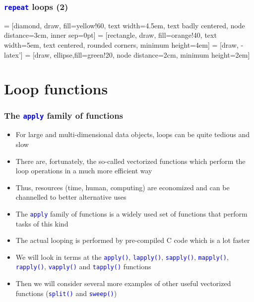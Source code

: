 \documentclass[10pt]{beamer}
\newcommand{\cc}[1]{\texttt{\textcolor{blue}{#1}}}
\theoremstyle{definition}
\begin{document}
\begin{frame}[fragile]
\frametitle{\cc{repeat} loops (2)}
 = [diamond, draw, fill=yellow!60, 
    text width=4.5em, text badly centered, node distance=3cm, inner sep=0pt]
 = [rectangle, draw, fill=orange!40, 
    text width=5em, text centered, rounded corners, minimum height=4em]
 = [draw, -latex']
 = [draw, ellipse,fill=green!20, node distance=2cm,
    minimum height=2em]

\begin{center}
\end{center} 
\end{frame}

\section{Loop functions}
\begin{frame}[fragile]
\frametitle{The \cc{apply} family of functions}
\begin{itemize}
	\item For large and multi-dimensional data objects, loops can be quite tedious and slow
	\item There are, fortunately, the so-called vectorized functions which perform the loop operations in a much more efficient way
	\item Thus, resources (time, human, computing) are economized and can be channelled to better alternative uses
	\item The \cc{apply} family of functions is a widely used set of functions that perform tasks of this kind
	\item The actual looping is performed by pre-compiled C code which is a lot faster 
	\item We will look in terms at the \cc{apply()}, \cc{lapply()}, \cc{sapply()}, \cc{mapply()}, \cc{rapply()}, \cc{vapply()} and \cc{tapply()} functions
	\item Then we will consider several more examples of other useful vectorized functions (\cc{split()} and \cc{sweep()})
\end{itemize}
\end{frame}
\end{document}
